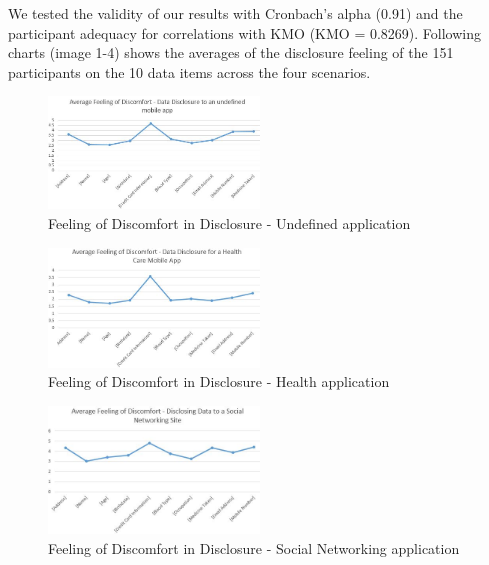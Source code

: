 \documentclass[conference]{IEEEtran}
\begin{document}
We tested the validity of our results with Cronbach's alpha (0.91) and the participant adequacy for correlations with KMO (KMO =  0.8269). Following charts (image 1-4) shows the averages of the disclosure feeling of the 151 participants on the 10 data items across the four scenarios.

\begin{figure}[h]
\begin{center}
\includegraphics[width=0.5\textwidth]{Average_Generic}
\caption{Feeling of Discomfort in Disclosure - Undefined application}
\end{center}
\end{figure}

\begin{figure}[h]
\begin{center}
\includegraphics[width=0.5\textwidth]{Average_Health}
\caption{Feeling of Discomfort in Disclosure - Health  application}
\end{center}
\end{figure}

\begin{figure}[h]
\begin{center}
\includegraphics[width=0.5\textwidth]{Average_SocialNetworking}
\caption{Feeling of Discomfort in Disclosure - Social Networking application}
\end{center}
\end{figure}
\end{document}
